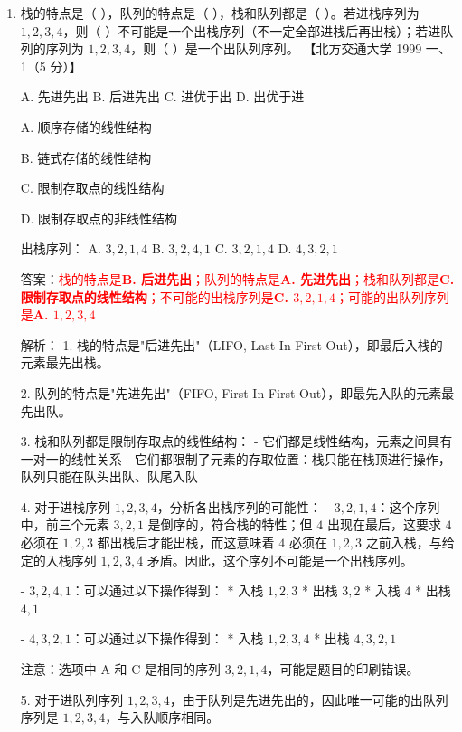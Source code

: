 \documentclass[lang=cn,newtx,10pt,scheme=chinese]{../../../elegantbook}
\begin{document}
\begin{enumerate}
    \item 栈的特点是（ ），队列的特点是（ ），栈和队列都是（ ）。若进栈序列为 $1, 2, 3, 4$，则（ ）不可能是一个出栈序列（不一定全部进栈后再出栈）；若进队列的序列为 $1, 2, 3, 4$，则（ ）是一个出队列序列。  
    【北方交通大学 1999 一、1（5 分）】  
   
    A. 先进先出 \quad B. 后进先出 \quad C. 进优于出 \quad D. 出优于进  

    A. 顺序存储的线性结构 

    B. 链式存储的线性结构  

    C. 限制存取点的线性结构  

    D. 限制存取点的非线性结构  

    出栈序列：  
    A. $3, 2, 1, 4$ \quad B. $3, 2, 4, 1$ \quad C. $3, 2, 1, 4$ \quad D. $4, 3, 2, 1$  

    答案：\textcolor{red}{栈的特点是\textbf{B. 后进先出}；队列的特点是\textbf{A. 先进先出}；栈和队列都是\textbf{C. 限制存取点的线性结构}；不可能的出栈序列是\textbf{C. $3, 2, 1, 4$}；可能的出队列序列是\textbf{A. $1, 2, 3, 4$}}

    解析：
    1. 栈的特点是"后进先出"（LIFO, Last In First Out），即最后入栈的元素最先出栈。
    
    2. 队列的特点是"先进先出"（FIFO, First In First Out），即最先入队的元素最先出队。
    
    3. 栈和队列都是限制存取点的线性结构：
       - 它们都是线性结构，元素之间具有一对一的线性关系
       - 它们都限制了元素的存取位置：栈只能在栈顶进行操作，队列只能在队头出队、队尾入队
    
    4. 对于进栈序列 $1, 2, 3, 4$，分析各出栈序列的可能性：
       - $3, 2, 1, 4$：这个序列中，前三个元素 $3, 2, 1$ 是倒序的，符合栈的特性；但 $4$ 出现在最后，这要求 $4$ 必须在 $1, 2, 3$ 都出栈后才能出栈，而这意味着 $4$ 必须在 $1, 2, 3$ 之前入栈，与给定的入栈序列 $1, 2, 3, 4$ 矛盾。因此，这个序列不可能是一个出栈序列。
       
       - $3, 2, 4, 1$：可以通过以下操作得到：
         * 入栈 $1, 2, 3$
         * 出栈 $3, 2$
         * 入栈 $4$
         * 出栈 $4, 1$
         
       - $4, 3, 2, 1$：可以通过以下操作得到：
         * 入栈 $1, 2, 3, 4$
         * 出栈 $4, 3, 2, 1$
       
       注意：选项中 A 和 C 是相同的序列 $3, 2, 1, 4$，可能是题目的印刷错误。
    
    5. 对于进队列序列 $1, 2, 3, 4$，由于队列是先进先出的，因此唯一可能的出队列序列是 $1, 2, 3, 4$，与入队顺序相同。


\end{enumerate}
\end{document}
